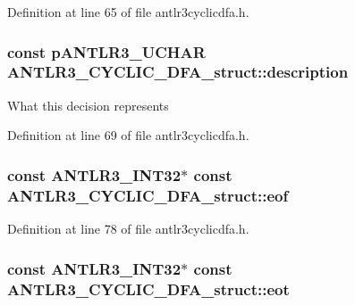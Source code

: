 Definition at line 65 of file antlr3cyclicdfa.\-h.

\hypertarget{struct_a_n_t_l_r3___c_y_c_l_i_c___d_f_a__struct_a2ea19b86bf05014f68fa9ca3ecc760dc}{
\subsubsection[{description}]{\setlength{\rightskip}{0pt plus 5cm}const {\bf p\-A\-N\-T\-L\-R3\-\_\-\-U\-C\-H\-A\-R} A\-N\-T\-L\-R3\-\_\-\-C\-Y\-C\-L\-I\-C\-\_\-\-D\-F\-A\-\_\-struct\-::description}}\label{struct_a_n_t_l_r3___c_y_c_l_i_c___d_f_a__struct_a2ea19b86bf05014f68fa9ca3ecc760dc}
What this decision represents 

Definition at line 69 of file antlr3cyclicdfa.\-h.

\hypertarget{struct_a_n_t_l_r3___c_y_c_l_i_c___d_f_a__struct_af87118c3402a6cf8d33be8673f7174e5}{
\subsubsection[{eof}]{\setlength{\rightskip}{0pt plus 5cm}const {\bf A\-N\-T\-L\-R3\-\_\-\-I\-N\-T32}$\ast$ const A\-N\-T\-L\-R3\-\_\-\-C\-Y\-C\-L\-I\-C\-\_\-\-D\-F\-A\-\_\-struct\-::eof}}\label{struct_a_n_t_l_r3___c_y_c_l_i_c___d_f_a__struct_af87118c3402a6cf8d33be8673f7174e5}


Definition at line 78 of file antlr3cyclicdfa.\-h.

\hypertarget{struct_a_n_t_l_r3___c_y_c_l_i_c___d_f_a__struct_aa483fc633ac657a66852b61926402f36}{
\subsubsection[{eot}]{\setlength{\rightskip}{0pt plus 5cm}const {\bf A\-N\-T\-L\-R3\-\_\-\-I\-N\-T32}$\ast$ const A\-N\-T\-L\-R3\-\_\-\-C\-Y\-C\-L\-I\-C\-\_\-\-D\-F\-A\-\_\-struct\-::eot}}\label{struct_a_n_t_l_r3___c_y_c_l_i_c___d_f_a__struct_aa483fc633ac657a66852b61926402f36}


